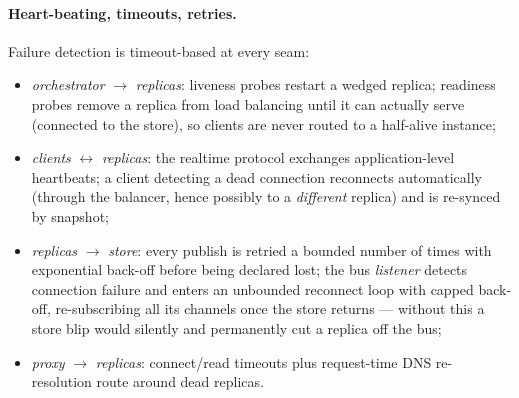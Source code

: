 \documentclass{scrartcl}
\begin{document}
\paragraph{Heart-beating, timeouts, retries.}
Failure detection is timeout-based at every seam:
\begin{itemize}
      \item \emph{orchestrator} $\to$ \emph{replicas}: liveness probes restart a
            wedged replica; readiness probes remove a replica from load balancing until it
            can actually serve (connected to the store), so clients are never routed to a
            half-alive instance;
      \item \emph{clients} $\leftrightarrow$ \emph{replicas}: the realtime protocol
            exchanges application-level heartbeats; a client detecting a dead connection
            reconnects automatically (through the balancer, hence possibly to a
            \emph{different} replica) and is re-synced by snapshot;
      \item \emph{replicas} $\to$ \emph{store}: every publish is retried a bounded
            number of times with exponential back-off before being declared lost; the bus
            \emph{listener} detects connection failure and enters an unbounded reconnect
            loop with capped back-off, re-subscribing all its channels once the store
            returns --- without this a store blip would silently and permanently cut a
            replica off the bus;
      \item \emph{proxy} $\to$ \emph{replicas}: connect/read timeouts plus
            request-time DNS re-resolution route around dead replicas.
\end{itemize}
\end{document}

